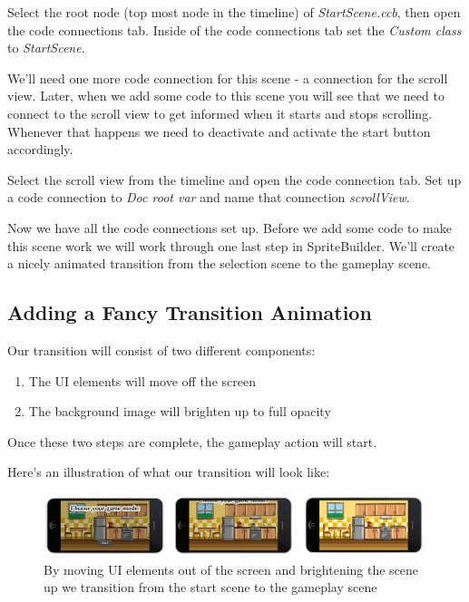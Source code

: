 \begin{leftbar}
Select the root node (top most node in the timeline) of \textit{StartScene.ccb},
then open the code connections tab. Inside of the code connections tab set the
\textit{Custom class} to \textit{StartScene}.
\end{leftbar}

We'll need one more code connection for this scene - a connection for the
scroll view. Later, when we add some code to this scene you will see that we
need to connect to the scroll view to get informed when it
starts and stops scrolling. Whenever that happens we need to deactivate and
activate the start button accordingly.

\begin{leftbar}
Select the scroll view from the timeline and open the code connection tab. Set
up a code connection to \textit{Doc root var} and name that connection
\textit{scrollView}.
\end{leftbar}

Now we have all the code connections set up. Before we add some code to make
this scene work we will work through one last step in SpriteBuilder. We'll
create a nicely animated transition from the selection scene to the gameplay scene.

\subsection{Adding a Fancy Transition Animation}

Our transition will consist of two different components:
\begin{enumerate}
  \item The UI elements will move off the screen
  \item The background image will brighten up to full opacity
\end{enumerate}

Once these two steps are complete, the gameplay action will start.

Here's an illustration of what our transition will look like:
\begin{figure}[H]
		\centering
		\includegraphics[width=0.85\linewidth]{images/Chapter7/gameplay_transition.png}
		\caption{By moving UI elements out of the screen and brightening the scene up
		we transition from the start scene to the gameplay scene}
\end{figure}

